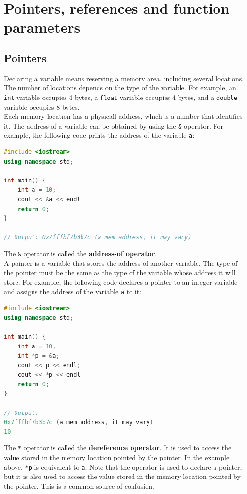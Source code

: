 \chapter{Pointers, references and function parameters}

\section{Pointers}

Declaring a variable means reserving a memory area, including several locations.
The number of locations depends on the type of the variable. For example, an
\texttt{int} variable occupies 4 bytes, a \texttt{float} variable occupies 4
bytes, and a \texttt{double} variable occupies 8 bytes. \\

Each memory location has a physicall address, which is a number that identifies
it. The address of a variable can be obtained by using the \texttt{\&} operator.
For example, the following code prints the address of the variable \texttt{a}:

\begin{lstlisting}[language=C++]
#include <iostream>
using namespace std;

int main() {
    int a = 10;
    cout << &a << endl;
    return 0;
}

// Output: 0x7fffbf7b3b7c (a mem address, it may vary)
\end{lstlisting}

The \texttt{\&} operator is called the \textbf{address-of operator}.\\

A pointer is a variable that stores the address of another variable. The type of
the pointer must be the same as the type of the variable whose address it will
store. For example, the following code declares a pointer to an integer variable
and assigns the address of the variable \texttt{a} to it:

\begin{lstlisting}[language=C++]
#include <iostream>
using namespace std;

int main() {
    int a = 10;
    int *p = &a;
    cout << p << endl;
    cout << *p << endl;
    return 0;
}

// Output: 
0x7fffbf7b3b7c (a mem address, it may vary)
10
\end{lstlisting}


The \texttt{*} operator is called the \textbf{dereference operator}. It is used
to access the value stored in the memory location pointed by the pointer. In the
example above, \texttt{*p} is equivalent to \texttt{a}. Note that the operator is
used to declare a pointer, but it is also used to access the value stored in the
memory location pointed by the pointer. This is a common source of confusion.\\

